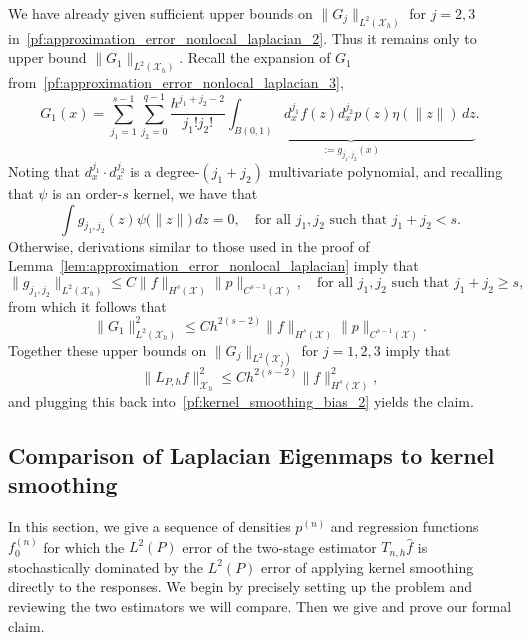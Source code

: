 \documentclass[aos]{imsart}
\theoremstyle{plain}
\theoremstyle{definition}
\theoremstyle{remark}
\newcommand{\wh}[1]{\widehat{#1}}
\newcommand{\mc}[1]{\mathcal{#1}}
\newcommand{\1}{\mathbf{1}}
\begin{document}
We have already given sufficient upper bounds on $\|G_j\|_{L^2(\mc{X}_{h})}$ for $j = 2,3$ in~\eqref{pf:approximation_error_nonlocal_laplacian_2}.  Thus it remains only to upper bound $\|G_1\|_{L^2(\mc{X}_h)}$. Recall the expansion of $G_1$ from~\eqref{pf:approximation_error_nonlocal_laplacian_3},
\begin{equation*}
G_1(x) = \sum_{j_1 = 1}^{s - 1} \sum_{j_2 = 0}^{q - 1} \frac{h^{j_1 + j_2 - 2}}{j_1!j_2!}  \underbrace{\int_{B(0,1)} d_x^{j_1}f(z) d_x^{j_2}p(z) \eta(\|z\|) \,dz}_{:= g_{j_1,j_2}(x)}.
\end{equation*}
Noting that $d_x^{j_1} \cdot d_x^{j_2}$ is a degree-$(j_1 + j_2)$ multivariate polynomial, and recalling that $\psi$ is an order-$s$ kernel, we have that 
\begin{equation*}
\int g_{j_1,j_2}(z) \psi\bigl(\|z\|\bigr) \,dz = 0,\quad \textrm{for all $j_1,j_2$ such that $j_1 + j_2 < s$.}
\end{equation*}
Otherwise, derivations similar to those used in the proof of Lemma~\ref{lem:approximation_error_nonlocal_laplacian} imply that
\begin{equation*}
\|g_{j_1,j_2}\|_{L^2(\mc{X}_h)} \leq C \|f\|_{H^s(\mc{X})} \|p\|_{C^{s - 1}(\mc{X})},\quad \textrm{for all $j_1,j_2$ such that $j_1 + j_2 \geq s$,}
\end{equation*}
from which it follows that
\begin{equation*}
\|G_1\|_{L^2(\mc{X}_h)}^2 \leq C  h^{2(s - 2)} \|f\|_{H^s(\mc{X})} \|p\|_{C^{s - 1}(\mc{X})}.
\end{equation*}
Together these upper bounds on $\|G_j\|_{L^2(\mc{X}_j)}$ for $j = 1,2,3$ imply that
\begin{equation*}
\|L_{P,h}f\|_{\mc{X}_h}^2 \leq Ch^{2(s - 2)} \|f\|_{H^s(\mc{X})}^2,
\end{equation*}
and plugging this back into~\eqref{pf:kernel_smoothing_bias_2} yields the claim.

\subsection{Comparison of Laplacian Eigenmaps to kernel smoothing}
\label{subsec:eigenmaps_beats_kernel_smoothing}

In this section, we give a sequence of densities $p^{(n)}$ and regression functions $f_0^{(n)}$ for which the $L^2(P)$ error of the two-stage estimator $T_{n,h}\wh{f}$ is stochastically dominated by the $L^2(P)$ error of applying kernel smoothing directly to the responses. We begin by precisely setting up the problem and reviewing the two estimators we will compare. Then we give and prove our formal claim.
\end{document}
